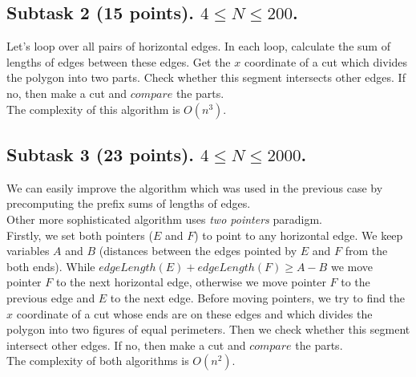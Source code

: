 \documentclass[a4paper,12pt]{article}
\begin{document}
\subsection*{Subtask 2 (15 points). $4 \le N \le 200$.}
Let's loop over all pairs of horizontal edges. In each loop, calculate the sum of lengths of edges between these edges. Get the $x$ coordinate of a cut which divides
the polygon into two parts. Check whether this segment intersects other edges. If no, then make a cut and $compare$ the parts.
\\The complexity of this algorithm is $O(n^3)$.

\subsection*{Subtask 3 (23 points). $4 \le N \le 2 000$.}
We can easily improve the algorithm which was used in the previous case by precomputing the prefix sums of lengths of edges.
\\Other more sophisticated algorithm uses \textit{two pointers} paradigm.
\\Firstly, we set both pointers ($E$ and $F$) to point to any horizontal edge. We keep variables $A$ and $B$ 
(distances between the edges pointed by $E$ and $F$ from the both ends). 
While $edgeLength(E) + edgeLength(F) \ge A - B$ we move pointer $F$ to the
next horizontal edge, otherwise we move pointer $F$ to the previous edge and $E$ to the next edge.
Before moving pointers, we try to find the $x$ coordinate of a cut whose ends are on these edges and 
which divides the polygon into two figures of equal perimeters. Then we check whether this segment intersect other edges. 
If no, then make a cut and $compare$ the parts.
\\The complexity of both algorithms is $O(n^2)$.
\end{document}
